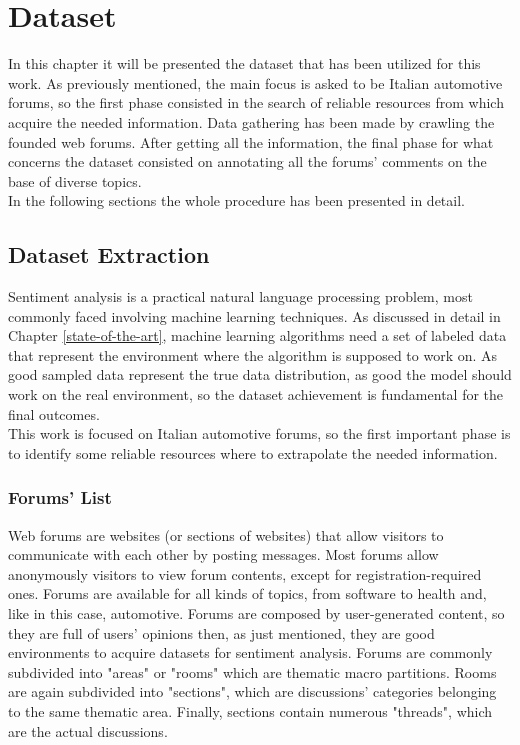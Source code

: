 
\chapter{Dataset}
\label{dataset}

In this chapter it will be presented the dataset that has been utilized for this work. As previously mentioned, the main focus is asked to be Italian automotive forums, so the first phase consisted in the search of reliable resources from which acquire the needed information. Data gathering has been made by crawling the founded web forums. After getting all the information, the final phase for what concerns the dataset consisted on annotating all the forums' comments on the base of diverse topics. \\
In the following sections the whole procedure has been presented in detail.

\section{Dataset Extraction}

Sentiment analysis is a practical natural language processing problem, most commonly faced involving machine learning techniques. As discussed in detail in Chapter \ref{state-of-the-art}, machine learning algorithms need a set of labeled data that represent the environment where the algorithm is supposed to work on. As good sampled data represent the true data distribution, as good the model should work on the real environment, so the dataset achievement is fundamental for the final outcomes.\\
This work is focused on Italian automotive forums, so the first important phase is to identify some reliable resources where to extrapolate the needed information. 


\subsection{Forums' List}

Web forums are websites (or sections of websites) that allow visitors to communicate with each other by posting messages. Most forums allow anonymously visitors to view forum contents, except for registration-required ones. Forums are available for all kinds of topics, from software to health and, like in this case, automotive. Forums are composed by user-generated content, so they are full of users' opinions then, as just mentioned, they are good environments to acquire datasets for sentiment analysis. Forums are commonly subdivided into "areas" or "rooms" which are thematic macro partitions. Rooms are again subdivided into "sections", which are discussions' categories belonging to the same thematic area. Finally, sections contain numerous "threads", which are the actual discussions.\\



